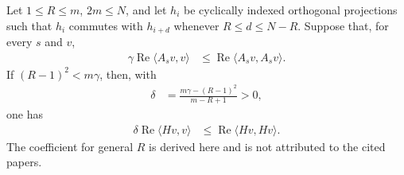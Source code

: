 \begin{lemma}
    \label{thm:finite_range_cyclic_knabe}
    \leanok
    Let $1\leq R\leq m$, $2m\leq N$, and let $h_i$ be cyclically indexed
    orthogonal projections such that $h_i$ commutes with $h_{i+d}$ whenever
    $R\leq d\leq N-R$. Suppose that, for every $s$ and $v$,
    \begin{align}
        \gamma\operatorname{Re}\langle A_sv,v\rangle
         & \leq\operatorname{Re}\langle A_sv,A_sv\rangle.
    \end{align}
    If $(R-1)^2<m\gamma$, then, with
    \begin{align}
        \delta & =\frac{m\gamma-(R-1)^2}{m-R+1}>0,
    \end{align}
    one has
    \begin{align}
        \delta\operatorname{Re}\langle Hv,v\rangle
         & \leq\operatorname{Re}\langle Hv,Hv\rangle.
    \end{align}
    The coefficient for general $R$ is derived here and is not attributed to
    the cited papers.
\end{lemma}

